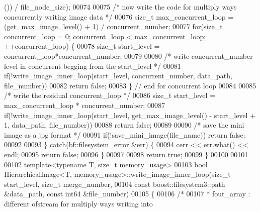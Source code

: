 \begin{DoxyCode}
      ()) / file\_node\_size);
00074 
00075                 \textcolor{comment}{/* now write the code for multiply ways concurrently writing
       image data */}
00076                 \textcolor{keywordtype}{size\_t} max\_concurrent\_loop = (get\_max\_image\_level() + 1) / 
      concurrent\_number;
00077                 \textcolor{keywordflow}{for}(\textcolor{keywordtype}{size\_t} concurrent\_loop = 0; concurrent\_loop < 
      max\_concurrent\_loop; ++concurrent\_loop) \{
00078                         \textcolor{keywordtype}{size\_t} start\_level = concurrent\_loop*concurrent\_number;
00079 
00080                         \textcolor{comment}{/* write concurrent\_number level in concurrent begging
       from the start\_level */}
00081                         \textcolor{keywordflow}{if}(!write\_image\_inner\_loop(start\_level, 
      concurrent\_number, data\_path, file\_number))
00082                                 \textcolor{keywordflow}{return} \textcolor{keyword}{false};
00083                 \} \textcolor{comment}{// end for concurrent loop}
00084 
00085                 \textcolor{comment}{/* write the residual concurrent\_loop */}
00086                 \textcolor{keywordtype}{size\_t} start\_level = max\_concurrent\_loop * concurrent\_number;
00087                 \textcolor{keywordflow}{if}(!write\_image\_inner\_loop(start\_level, get\_max\_image\_level() -
       start\_level + 1, data\_path, file\_number))
00088                         \textcolor{keywordflow}{return} \textcolor{keyword}{false};
00089 
00090                 \textcolor{comment}{/* save the mini image as a jpg format */}
00091                 \textcolor{keywordflow}{if}(!save\_mini\_image(file\_name)) \textcolor{keywordflow}{return} \textcolor{keyword}{false};
00092 
00093         \} \textcolor{keywordflow}{catch}(bf::filesystem\_error &err) \{
00094                 cerr << err.what() << endl;
00095                 \textcolor{keywordflow}{return} \textcolor{keyword}{false};
00096         \}
00097 
00098         \textcolor{keywordflow}{return} \textcolor{keyword}{true};
00099 \}
00100 
00101 
00102 \textcolor{keyword}{template}<\textcolor{keyword}{typename} T, \textcolor{keywordtype}{size\_t} memory\_usage>
00103 \textcolor{keywordtype}{bool} HierarchicalImage<T, memory_usage>::write_image_inner_loop(\textcolor{keywordtype}{size\_t} 
      start\_level, \textcolor{keywordtype}{size\_t} merge\_number,
00104         \textcolor{keyword}{const} boost::filesystem3::path &data\_path, \textcolor{keyword}{const} int64 &file\_number)
00105 \{
00106         \textcolor{comment}{/*}
00107 \textcolor{comment}{        *       fout\_array : different ofstream for multiply ways writing into
}
\end{DoxyCode}

